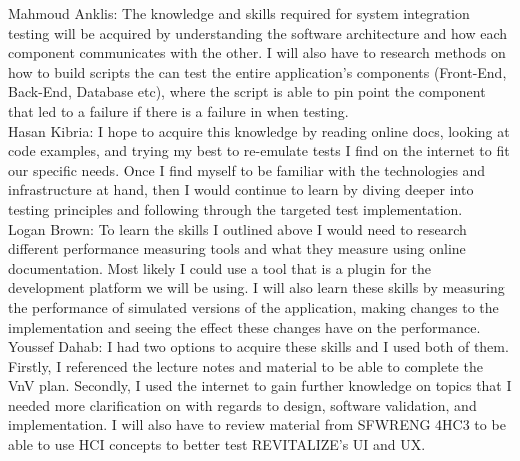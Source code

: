 \documentclass[12pt, titlepage]{article}
\begin{document}
\noindent Mahmoud Anklis: The  knowledge and skills required for system integration testing will be acquired by understanding the software architecture and how each component communicates with the other. I will also have to research methods on how to build scripts the can test the entire application's components (Front-End, Back-End, Database etc), where the script is able to pin point the component that led to a failure if there is a failure in when testing.\\

\noindent Hasan Kibria: I hope to acquire this knowledge by reading online docs, looking at code examples, and trying my best to re-emulate tests I find on the internet to fit our specific needs. Once I find myself to be familiar with the technologies and infrastructure at hand, then I would continue to learn by diving deeper into testing principles and following through the targeted test implementation.\\

\noindent Logan Brown: To learn the skills I outlined above I would need to research different performance measuring tools and what they measure using online documentation. Most likely I could use a tool that is a plugin for the development platform we will be using. I will also learn these skills by measuring the performance of simulated versions of the application, making changes to the implementation and seeing the effect these changes have on the performance.\\

\noindent Youssef Dahab: I had two options to acquire these skills and I used both of them. Firstly, I referenced the lecture notes and material to be able to complete the VnV plan. Secondly, I used the internet to gain further knowledge on topics that I needed more clarification on with regards to design, software validation, and implementation. I will also have to review material from SFWRENG 4HC3 to be able to use HCI concepts to better test REVITALIZE's UI and UX.\\
\end{document}
